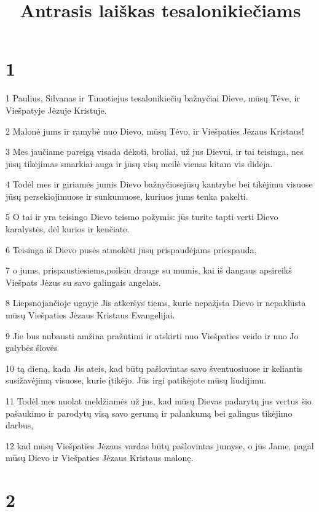 

\title{Antrasis laiškas tesalonikiečiams}

\chapter{1}


\par 1 Paulius, Silvanas ir Timotiejus tesalonikiečių bažnyčiai Dieve, mūsų Tėve, ir Viešpatyje Jėzuje Kristuje. 
\par 2 Malonė jums ir ramybė nuo Dievo, mūsų Tėvo, ir Viešpaties Jėzaus Kristaus! 
\par 3 Mes jaučiame pareigą visada dėkoti, broliai, už jus Dievui, ir tai teisinga, nes jūsų tikėjimas smarkiai auga ir jūsų visų meilė vienas kitam vis didėja. 
\par 4 Todėl mes ir giriamės jumis Dievo bažnyčiose­jūsų kantrybe bei tikėjimu visuose jūsų persekiojimuose ir sunkumuose, kuriuos jums tenka pakelti. 
\par 5 O tai ir yra teisingo Dievo teismo požymis: jūs turite tapti verti Dievo karalystės, dėl kurios ir kenčiate. 
\par 6 Teisinga iš Dievo pusės atmokėti jūsų prispaudėjams priespauda, 
\par 7 o jums, prispaustiesiems,­poilsiu drauge su mumis, kai iš dangaus apsireikš Viešpats Jėzus su savo galingais angelais. 
\par 8 Liepsnojančioje ugnyje Jis atkeršys tiems, kurie nepažįsta Dievo ir nepaklūsta mūsų Viešpaties Jėzaus Kristaus Evangelijai. 
\par 9 Jie bus nubausti amžina pražūtimi ir atskirti nuo Viešpaties veido ir nuo Jo galybės šlovės 
\par 10 tą dieną, kada Jis ateis, kad būtų pašlovintas savo šventuosiuose ir keliantis susižavėjimą visuose, kurie įtikėjo. Jūs irgi patikėjote mūsų liudijimu. 
\par 11 Todėl mes nuolat meldžiamės už jus, kad mūsų Dievas padarytų jus vertus šio pašaukimo ir parodytų visą savo gerumą ir palankumą bei galingus tikėjimo darbus, 
\par 12 kad mūsų Viešpaties Jėzaus vardas būtų pašlovintas jumyse, o jūs Jame, pagal mūsų Dievo ir Viešpaties Jėzaus Kristaus malonę.


\chapter{2}


